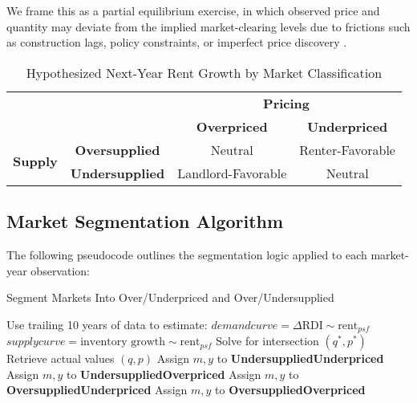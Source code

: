 \documentclass[sn-mathphys-num]{sn-jnl}%
\theoremstyle{thmstyleone}%
\theoremstyle{thmstyletwo}%
\theoremstyle{thmstylethree}%
\begin{document}
We frame this as a partial equilibrium exercise, in which observed price and quantity may deviate from the implied market-clearing levels due to frictions such as construction lags, policy constraints, or imperfect price discovery \citep{wheaton1991realestate, glaeser2019rethinking}.

\begin{table}[h!]
	\centering
	\caption{Hypothesized Next-Year Rent Growth by Market Classification}
	\begin{tabular}{cc|c|c|}
		\multicolumn{2}{c}{} & \multicolumn{2}{c}{\textbf{Pricing}} \\
		\multicolumn{2}{c}{} & \textbf{Overpriced} & \textbf{Underpriced} \\
		\cmidrule{3-4}
		\multirow{2}{*}{\textbf{Supply}} & \textbf{Oversupplied} & Neutral & Renter-Favorable \\
		\cmidrule{2-4}
		& \textbf{Undersupplied} & Landlord-Favorable & Neutral \\
		\bottomrule
	\end{tabular}
\end{table}

\subsection{Market Segmentation Algorithm}

The following pseudocode outlines the segmentation logic applied to each market-year observation:

\begin{algorithm}[H]
	\caption{Segment Markets Into Over/Underpriced and Over/Undersupplied}
	\label{alg:market_segmentation}
	\begin{algorithmic}[1]
		\State Use trailing 10 years of data to estimate:
		\State \hspace{1em} $demandcurve = \Delta\text{RDI} \sim \text{rent}_{psf}$
		\State \hspace{1em} $supplycurve = \text{inventory growth} \sim \text{rent}_{psf}$
		\State Solve for intersection $ (q^*, p^*) $
		\State Retrieve actual values $ (q, p) $
		\State Assign $m, y$ to \textbf{UndersuppliedUnderpriced}
		\Else
		\State Assign $m, y$ to \textbf{UndersuppliedOverpriced}
		\EndIf
		\Else
		\State Assign $m, y$ to \textbf{OversuppliedUnderpriced}
		\Else
		\State Assign $m, y$ to \textbf{OversuppliedOverpriced}
		\EndIf
		\EndIf
		\EndFor
		\EndFor
	\end{algorithmic}
\end{algorithm}
\end{document}
